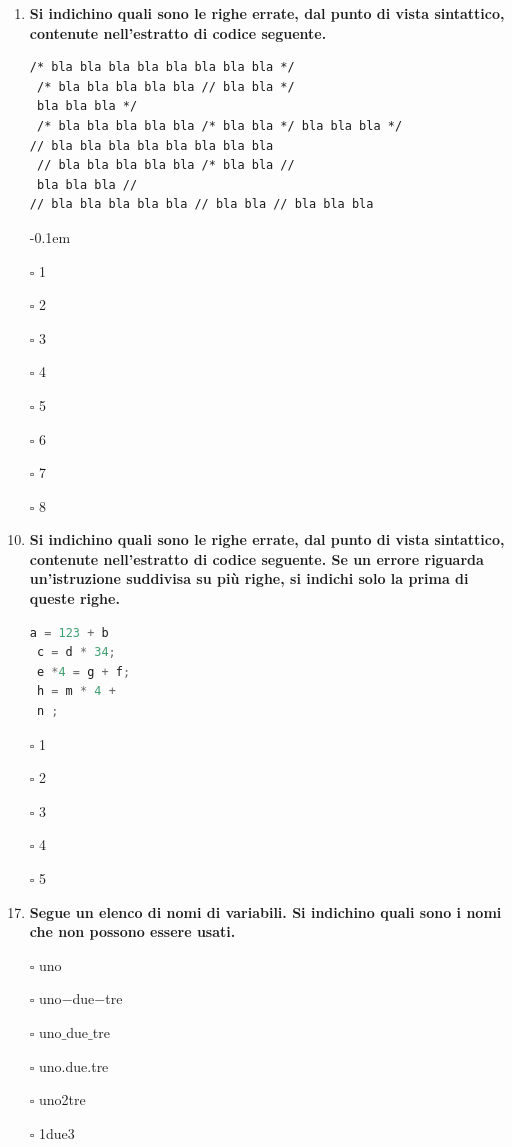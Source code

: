 \documentclass[11pt]{article}
\begin{document}
\begin{enumerate}
\item {\bf Si indichino quali sono le righe errate, dal punto di vista sintattico, contenute nell'estratto di codice seguente. }
\begin{lstlisting}[]
/* bla bla bla bla bla bla bla bla */
 /* bla bla bla bla bla // bla bla */
 bla bla bla */
 /* bla bla bla bla bla /* bla bla */ bla bla bla */
// bla bla bla bla bla bla bla bla
 // bla bla bla bla bla /* bla bla //
 bla bla bla //
// bla bla bla bla bla // bla bla // bla bla bla
\end{lstlisting}
\itemsep-0.1em
\item[$\square$] 1
\item[$\square$] 2
\item[$\square$] 3
\item[$\square$] 4
\item[$\square$] 5
\item[$\square$] 6
\item[$\square$] 7
\item[$\square$] 8

\item {\bf Si indichino quali sono le righe errate, dal punto di vista sintattico, contenute nell'estratto di codice seguente. Se un errore riguarda un'istruzione
suddivisa su pi\`{u} righe, si indichi solo la prima di queste righe.}
 \begin{lstlisting}[language=c]
 a = 123 + b
 c = d * 34;
 e *4 = g + f;
 h = m * 4 +
 n ;
 \end{lstlisting}
\item [\nonumber]
\item[$\square$] 1
\item[$\square$] 2
\item[$\square$] 3
\item[$\square$] 4
\item[$\square$] 5

 \item {\bf Segue un elenco di nomi di variabili. Si indichino quali sono i nomi che non possono essere usati.}
\item[$\square$]  uno
\item[$\square$] uno$-$due$-$tre
\item[$\square$]  uno$\_$due$\_$tre
\item[$\square$]  uno.due.tre
\item[$\square$]  uno2tre
\item[$\square$] 1due3


\end{enumerate}
\end{document}
